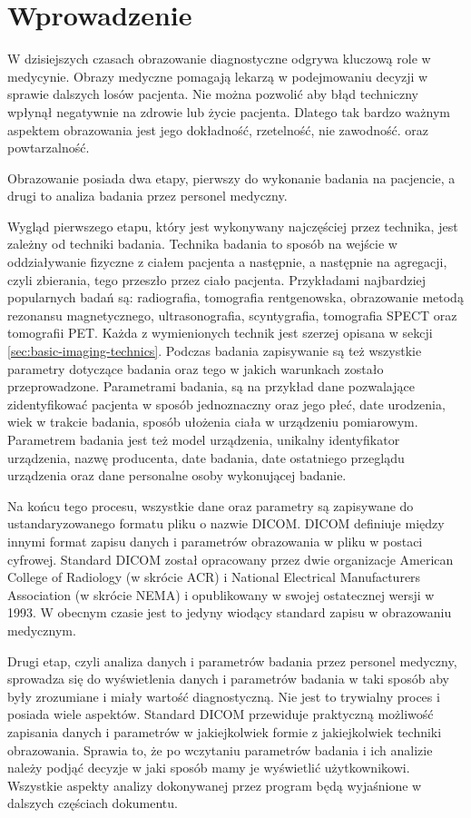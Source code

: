\section{Wprowadzenie}

W dzisiejszych czasach obrazowanie diagnostyczne odgrywa kluczową role w medycynie.
Obrazy medyczne pomagają lekarzą w podejmowaniu decyzji w sprawie dalszych losów pacjenta.
Nie można pozwolić aby błąd techniczny wpłynął negatywnie na zdrowie lub życie pacjenta.
Dlatego tak bardzo ważnym aspektem obrazowania jest jego dokładność, rzetelność, nie zawodność. oraz powtarzalność.

Obrazowanie posiada dwa etapy, pierwszy do wykonanie badania na pacjencie, a drugi to analiza badania przez personel medyczny.

Wygląd pierwszego etapu, który jest wykonywany najczęściej przez technika, jest zależny od techniki badania.
Technika badania to sposób na wejście w oddziaływanie fizyczne z ciałem pacjenta a następnie, a następnie na agregacji, czyli zbierania, tego przeszło przez ciało pacjenta.
Przykładami najbardziej popularnych badań są: radiografia, tomografia rentgenowska, obrazowanie metodą rezonansu magnetycznego, ultrasonografia, scyntygrafia, tomografia SPECT oraz tomografii PET.
Każda z wymienionych technik jest szerzej opisana w sekcji \ref{sec:basic-imaging-technics}.
Podczas badania zapisywanie są też wszystkie parametry dotyczące badania oraz tego w jakich warunkach zostało przeprowadzone.
Parametrami badania, są na przykład dane pozwalające zidentyfikować pacjenta w sposób jednoznaczny oraz jego płeć, date urodzenia, wiek w trakcie badania, sposób ułożenia ciała w urządzeniu pomiarowym.
Parametrem badania jest też model urządzenia, unikalny identyfikator urządzenia, nazwę producenta, date badania, date ostatniego przeglądu urządzenia oraz dane personalne osoby wykonującej badanie.

Na końcu tego procesu, wszystkie dane oraz parametry są zapisywane do ustandaryzowanego formatu pliku o nazwie DICOM.
DICOM definiuje między innymi format zapisu danych i parametrów obrazowania w pliku w postaci cyfrowej.
Standard DICOM został opracowany przez dwie organizacje American College of Radiology (w skrócie ACR) i National Electrical Manufacturers Association (w skrócie NEMA) i opublikowany w swojej ostatecznej wersji w 1993.
W obecnym czasie jest to jedyny wiodący standard zapisu w obrazowaniu medycznym.

Drugi etap, czyli analiza danych i parametrów badania przez personel medyczny, sprowadza się do wyświetlenia danych i parametrów badania w taki sposób aby były zrozumiane i miały wartość diagnostyczną.
Nie jest to trywialny proces i posiada wiele aspektów.
Standard DICOM przewiduje praktyczną możliwość zapisania danych i parametrów w jakiejkolwiek formie z jakiejkolwiek techniki obrazowania.
Sprawia to, że po wczytaniu parametrów badania i ich analizie należy podjąć decyzje w jaki sposób mamy je wyświetlić użytkownikowi.
Wszystkie aspekty analizy dokonywanej przez program będą wyjaśnione w dalszych częściach dokumentu.

